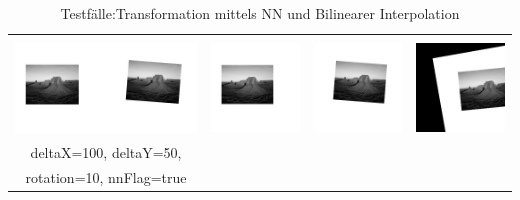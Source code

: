 \documentclass[12pt,german]{article}
\begin{document}
\begin{table}[H]
\begin{tabular}{| c | c | c | c |}
    \hline
     & & & \\
    \includegraphics[width=5cm]{images/register/gray1.jpg}  &
    \includegraphics[width=2.5cm]{images/register/first-half-image-01.jpg} &
    \includegraphics[width=2.5cm]{images/register/second-half-image-01.jpg} &
    \includegraphics[width=2.5cm]{images/register/transformed-image-04.jpg} \\
    deltaX=100, deltaY=50,  & & & \\
    rotation=10, nnFlag=true  & & & \\
    \hline
    
  \end{tabular}
  \caption{Testfälle:Transformation mittels NN und Bilinearer Interpolation}
  \label{tab:registerTest}
\end{table}



\end{document}
